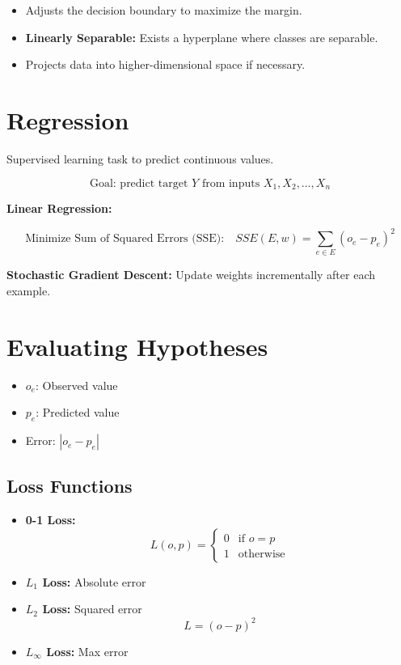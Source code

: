\begin{itemize}
    \item Adjusts the decision boundary to maximize the margin.
    \item \textbf{Linearly Separable:} Exists a hyperplane where classes are separable.
    \item Projects data into higher-dimensional space if necessary.
\end{itemize}

\section{Regression}

Supervised learning task to predict continuous values.

\[
\text{Goal: predict target } Y \text{ from inputs } X_1, X_2, \ldots, X_n
\]

\textbf{Linear Regression:}

\[
\text{Minimize Sum of Squared Errors (SSE):}
\quad SSE(E, w) = \sum_{e \in E} (o_e - p_e)^2
\]

\textbf{Stochastic Gradient Descent:} Update weights incrementally after each example.

\section{Evaluating Hypotheses}

\begin{itemize}
    \item $o_e$: Observed value
    \item $p_e$: Predicted value
    \item Error: $|o_e - p_e|$
\end{itemize}

\subsection{Loss Functions}

\begin{itemize}
    \item \textbf{0-1 Loss:}
    \[
    L(o, p) =
    \begin{cases}
    0 & \text{if } o = p \\
    1 & \text{otherwise}
    \end{cases}
    \]
    \item \textbf{$L_1$ Loss:} Absolute error
    \item \textbf{$L_2$ Loss:} Squared error
    \[
    L = (o - p)^2
    \]
    \item \textbf{$L_\infty$ Loss:} Max error
\end{itemize}

